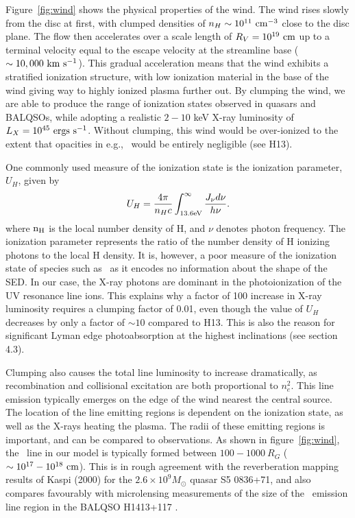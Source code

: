 \documentclass[preprint, a4paper, 11pt]{aastex}
\begin{document}
Figure~\ref{fig:wind} shows the physical properties of the wind.
The wind rises slowly from the disc at first, with clumped densities
of $n_H \sim 10^{11}~\rm{cm^{-3}}$ close to the disc plane.
The flow then accelerates over a scale length of $R_V=10^{19}~\rm{cm}$
up to a terminal velocity equal to the escape velocity at the streamline base
($\sim10,000~\rm{km~s^{-1}}$). This gradual acceleration means that
the wind exhibits a stratified ionization structure, with low ionization material
in the base of the wind giving way to highly ionized plasma further out.
By clumping the wind, we are able to produce the range of ionization states observed
in quasars and BALQSOs, while adopting a realistic $2-10$ keV X-ray luminosity
of $L_{X}=10^{45}~\rm{ergs~s^{-1}}$. Without clumping, this wind would be over-ionized 
to the extent that opacities in e.g., \civ\ would be entirely negligible (see H13).

One commonly used measure of the ionization state is the ionization parameter, $U_H$, given by
\begin{equation}
U_H = \frac{4\pi}{n_H c}\int_{13.6{\rm{eV}}}^{\infty}\frac{{J_{\nu}d\nu}}{h\nu}.
\end{equation}
\noindent where $\rm{n_H}$ is the local number density of H, and $\nu$ denotes photon 
frequency. The ionization parameter represents the ratio of the number density of 
H ionizing photons to the local H density. It is, however, a poor measure of the 
ionization state of species such as \civ\ as it encodes no information
about the shape of the SED. In our case, the X-ray photons 
are dominant in the photoionization of the UV resonance line ions. 
This explains why a factor of 100 increase in X-ray luminosity requires
a clumping factor of 0.01, even though the value of $U_H$ decreases by only a factor of $\sim10$ 
compared to H13. This is also the reason for significant Lyman edge photoabsorption
at the highest inclinations (see section 4.3).

Clumping also causes the total line luminosity to increase dramatically,
as recombination and collisional excitation are both proportional to
$n_e^2$. This line emission typically emerges on the edge of the wind
nearest the central source. The location of the line emitting regions
is dependent on the ionization state, as well as the X-rays heating the plasma.
The radii of these emitting regions is important,
and can be compared to observations. As shown in figure~\ref{fig:wind},
the \civ\ line in our model is typically formed between 
$100-1000~R_G$ ($\sim10^{17}-10^{18}~\rm{cm}$).
This is in rough agreement with the reverberation mapping 
results of Kaspi (2000) for the $2.6\times10^{9} M_\odot$ quasar S5 0836+71,
and also compares favourably with microlensing measurements of the size of the
\civ\ emission line region in the BALQSO H1413+117 \citep{odowd2015}.
\end{document}
